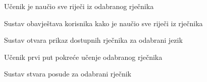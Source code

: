 \begin{packed_item}
\begin{packed_item}
\begin{packed_enum}
							\end{packed_enum}
							
							\item[1.c] Učenik je naučio sve riječi iz odabranog rječnika
							\item[] \begin{packed_enum}
								
								\item Sustav obavještava korisnika kako je naučio sve riječi iz rječnika
								\item Sustav otvara prikaz dostupnih rječnika za odabrani jezik
								
							\end{packed_enum}
							
							\item[2.a] Učenik prvi put pokreće učenje odabranog rječnika
							\item[] \begin{packed_enum}
								
								\item Sustav stvara posude za odabrani rječnik
								
							\end{packed_enum}
							
						\end{packed_item}
					\end{packed_item}
					
